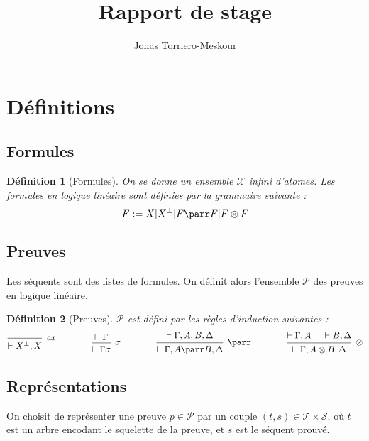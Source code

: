 \documentclass[11pt,a4paper]{article}
\title{Rapport de stage}
\author{Jonas Torriero-Meskour}
\newtheorem{definition}{Définition}
\newcommand*{\orth}{^\perp}
\newcommand*{\tensor}{\otimes}
\newcommand*{\hypv}[1]{\hypo{\vdash #1}}
\newcommand*{\axv}[1]{\infer{0}[\ensuremath{\mathit{ax}}]{\vdash #1}}
\newcommand*{\tensorv}[1]{\infer{2}[\ensuremath{\tensor}]{\vdash #1}}
\newcommand*{\parrv}[1]{\infer{1}[\ensuremath{\parr}]{\vdash #1}}
\newcommand*{\permv}[1]{\infer{1}[\ensuremath{\sigma}]{\vdash #1}}
\newcommand*{\proofs}{\ensuremath{\mathcal{P}}}
\newcommand*{\trees}{\ensuremath{\mathcal{T}}}
\begin{document}
\maketitle

\section{Définitions}

\subsection{Formules}
\begin{definition}[Formules]
On se donne un ensemble $\mathcal{X}$ infini d'atomes. Les formules en logique linéaire sont définies par la grammaire suivante :
\begin{equation*}
F := X | X\orth | F \parr F | F \tensor F
\end{equation*}
\end{definition}

\subsection{Preuves}
Les séquents sont des listes de formules. On définit alors l'ensemble \proofs{} des preuves en logique linéaire.
\begin{definition}[Preuves]
\proofs{} est défini par les règles d'induction suivantes :
\begin{equation*}
\begin{prooftree}
  \axv{X\orth, X}
\end{prooftree}
\qquad\qquad
\begin{prooftree}
  \hypv{\Gamma}
  \permv{\Gamma{\sigma}}
\end{prooftree}
\qquad\qquad
\begin{prooftree}
  \hypv{\Gamma, A, B, \Delta}
  \parrv{\Gamma, A \parr B, \Delta}
\end{prooftree}
\qquad\qquad
\begin{prooftree}
  \hypv{\Gamma, A}
  \hypv{B, \Delta}
  \tensorv{\Gamma, A \tensor B, \Delta}
\end{prooftree}
\end{equation*}
\end{definition}

\subsection{Représentations}
On choisit de représenter une preuve $p \in \mathcal{P}$ par un couple $(t, s) \in \trees \times \mathcal{S}$, où $t$ est un arbre encodant le squelette de la preuve, et $s$ est le séquent prouvé.
\end{document}
